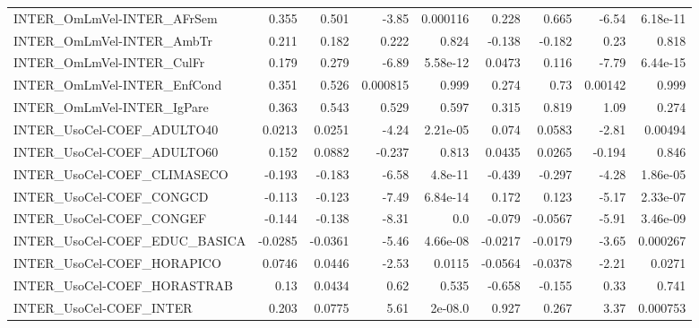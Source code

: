 \begin{tabular}{lrrrrrrrr}
INTER\_OmLmVel-INTER\_AFrSem            &       0.355 &        0.501 &    -3.85 & 0.000116 &      0.228 &       0.665 &        -6.54 &      6.18e-11 \\
INTER\_OmLmVel-INTER\_AmbTr             &       0.211 &        0.182 &    0.222 &    0.824 &     -0.138 &      -0.182 &         0.23 &         0.818 \\
INTER\_OmLmVel-INTER\_CulFr             &       0.179 &        0.279 &    -6.89 & 5.58e-12 &     0.0473 &       0.116 &        -7.79 &      6.44e-15 \\
INTER\_OmLmVel-INTER\_EnfCond           &       0.351 &        0.526 & 0.000815 &    0.999 &      0.274 &        0.73 &      0.00142 &         0.999 \\
INTER\_OmLmVel-INTER\_IgPare            &       0.363 &        0.543 &    0.529 &    0.597 &      0.315 &       0.819 &         1.09 &         0.274 \\
INTER\_UsoCel-COEF\_ADULTO40            &      0.0213 &       0.0251 &    -4.24 & 2.21e-05 &      0.074 &      0.0583 &        -2.81 &       0.00494 \\
INTER\_UsoCel-COEF\_ADULTO60            &       0.152 &       0.0882 &   -0.237 &    0.813 &     0.0435 &      0.0265 &       -0.194 &         0.846 \\
INTER\_UsoCel-COEF\_CLIMASECO           &      -0.193 &       -0.183 &    -6.58 &  4.8e-11 &     -0.439 &      -0.297 &        -4.28 &      1.86e-05 \\
INTER\_UsoCel-COEF\_CONGCD              &      -0.113 &       -0.123 &    -7.49 & 6.84e-14 &      0.172 &       0.123 &        -5.17 &      2.33e-07 \\
INTER\_UsoCel-COEF\_CONGEF              &      -0.144 &       -0.138 &    -8.31 &      0.0 &     -0.079 &     -0.0567 &        -5.91 &      3.46e-09 \\
INTER\_UsoCel-COEF\_EDUC\_BASICA         &     -0.0285 &      -0.0361 &    -5.46 & 4.66e-08 &    -0.0217 &     -0.0179 &        -3.65 &      0.000267 \\
INTER\_UsoCel-COEF\_HORAPICO            &      0.0746 &       0.0446 &    -2.53 &   0.0115 &    -0.0564 &     -0.0378 &        -2.21 &        0.0271 \\
INTER\_UsoCel-COEF\_HORASTRAB           &        0.13 &       0.0434 &     0.62 &    0.535 &     -0.658 &      -0.155 &         0.33 &         0.741 \\
INTER\_UsoCel-COEF\_INTER               &       0.203 &       0.0775 &     5.61 &  2e-08.0 &      0.927 &       0.267 &         3.37 &      0.000753 \\

\end{tabular}
